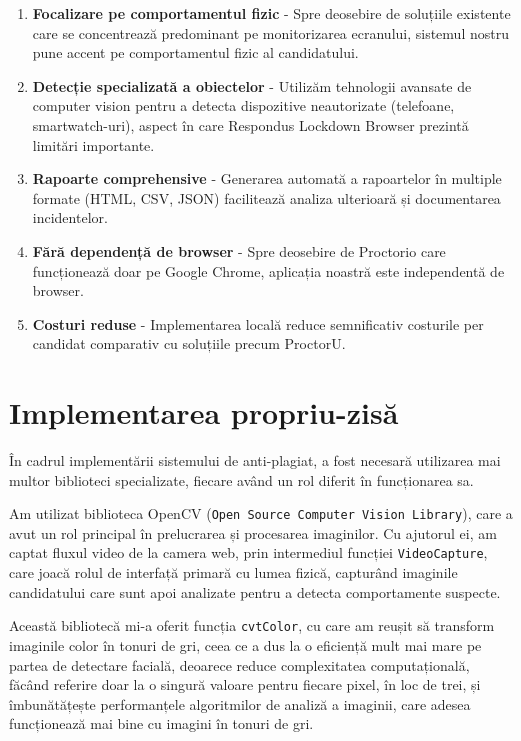 \documentclass[12pt,a4paper]{article}
\begin{document}
\begin{enumerate}
    \item \textbf{Focalizare pe comportamentul fizic} - Spre deosebire de soluțiile existente care se concentrează predominant pe monitorizarea ecranului, sistemul nostru pune accent pe comportamentul fizic al candidatului.
    
    \item \textbf{Detecție specializată a obiectelor} - Utilizăm tehnologii avansate de computer vision pentru a detecta dispozitive neautorizate (telefoane, smartwatch-uri), aspect în care Respondus Lockdown Browser prezintă limitări importante.
    
    \item \textbf{Rapoarte comprehensive} - Generarea automată a rapoartelor în multiple formate (HTML, CSV, JSON) facilitează analiza ulterioară și documentarea incidentelor.
    
    \item \textbf{Fără dependență de browser} - Spre deosebire de Proctorio care funcționează doar pe Google Chrome, aplicația noastră este independentă de browser.
    
    \item \textbf{Costuri reduse} - Implementarea locală reduce semnificativ costurile per candidat comparativ cu soluțiile precum ProctorU.
\end{enumerate}

\section{Implementarea propriu-zisă}

\hspace{6mm}În cadrul implementării sistemului de anti-plagiat, a fost necesară utilizarea mai multor biblioteci specializate, fiecare având un rol diferit în funcționarea sa.

Am utilizat biblioteca OpenCV (\texttt{Open Source Computer Vision Library}),
care a avut un rol principal în prelucrarea și procesarea imaginilor. Cu
ajutorul ei, am captat fluxul video de la camera web, prin intermediul
funcției \texttt{VideoCapture}, care joacă rolul de interfață primară cu lumea
fizică, capturând imaginile candidatului care sunt apoi analizate pentru
a detecta comportamente suspecte.

Această bibliotecă mi-a oferit funcția \texttt{cvtColor}, cu care am reușit să
transform imaginile color în tonuri de gri, ceea ce a dus la o eficiență
mult mai mare pe partea de detectare facială, deoarece reduce
complexitatea computațională, făcând referire doar la o singură valoare
pentru fiecare pixel, în loc de trei, și îmbunătățește performanțele
algoritmilor de analiză a imaginii, care adesea funcționează mai bine cu
imagini în tonuri de gri.
\end{document}
